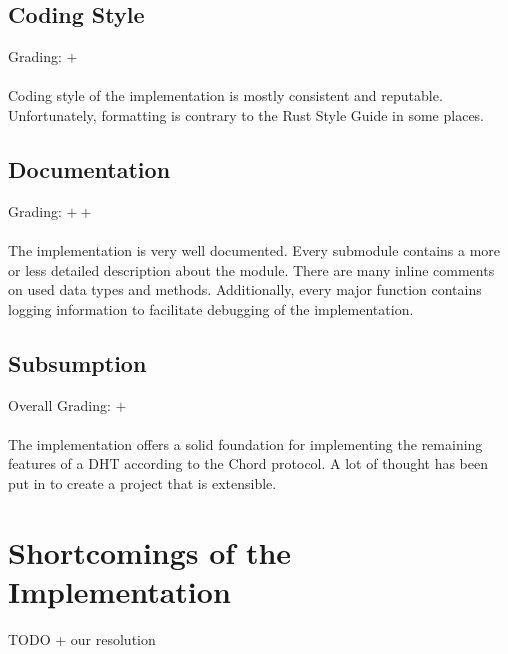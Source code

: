 \documentclass[a4paper, 11pt]{article}
\begin{document}
\subsection*{Coding Style}
Grading: $+$\\
\\
Coding style of the implementation is mostly consistent and reputable.
Unfortunately, formatting is contrary to the Rust Style Guide \cite{RustStyleGuide} in some places.


\subsection*{Documentation}
Grading: $++$\\
\\
The implementation is very well documented.
Every submodule contains a more or less detailed description about the module.
There are many inline comments on used data types and methods.
Additionally, every major function contains logging information to facilitate debugging of the implementation.


\subsection*{Subsumption}
Overall Grading: $+$\\
\\
The implementation offers a solid foundation for implementing the remaining features of a DHT according to the Chord protocol. 
A lot of thought has been put in to create a project that is extensible.

\section*{Shortcomings of the Implementation}
TODO + our resolution
\end{document}
